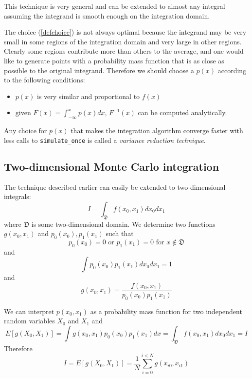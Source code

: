 \documentclass[justified,sixbynine]{tufte-book}
\def\ft{\small\tt}
\theoremstyle{plain}%
\theoremstyle{definition}
\theoremstyle{remark}
\begin{document}
\begin{fullwidth}
This technique is very general and can be extended to almost any integral
assuming the integrand is smooth enough on the integration domain.

The choice (\ref{defchoice}) is not always optimal because the integrand may
be very small in some regions of the integration domain and very large in
other regions. Clearly some regions contribute more than others to the
average, and one would like to generate points with a probability mass
function that is as close as possible to the original integrand. Therefore
we should choose a $p(x)$ according to the following conditions:

\begin{itemize}
\item  $p(x)$ is very similar and proportional to $f(x)$

\item  given $F(x)=\int_{-\infty }^xp(x)dx$, $F^{-1}(x)$ can be computed
analytically.
\end{itemize}

Any choice for $p(x)$ that makes the integration algorithm converge faster with less calls to {\ft simulate\_once} is called a {\it variance reduction technique}.

\goodbreak\subsection{Two-dimensional Monte Carlo integration}

The technique described earlier can easily be extended to two-dimensional integrals:
\begin{equation}
I=\int_{{\mathfrak D}}f(x_0,x_1)dx_0dx_1
\end{equation}
where ${\mathfrak D}$ is some two-dimensional domain. We determine two functions
$g(x_0,x_1)$ and $p_0(x_0),p_1(x_1)$ such that
\begin{equation}
p_0(x_0)=0\text{ or }p_1(x_1)=0\text{ for }x\notin {\mathfrak D}
\end{equation}
and
\begin{equation}
\int p_0(x_0)p_1(x_1)dx_0dx_1=1
\end{equation}
and
\begin{equation}
g(x_0,x_1)=\frac{f(x_0,x_1)}{p_0(x_0)p_1(x_1)}
\end{equation}

We can interpret $p(x_0,x_1)$ as a probability mass function for two
independent random variables $X_0$ and $X_1$ and
\begin{equation}
E[g(X_0,X_1)]=\int g(x_0,x_1)p_0(x_0)p_1(x_1)dx=\int_{{\mathfrak D}%
}f(x_0,x_1)dx_0dx_1=I
\end{equation}
Therefore
\begin{equation}
I = E[g(X_0,X_1)] = \frac 1N\sum_{i=0}^{i<N}g(x_{i0},x_{i1})
\end{equation}


\end{fullwidth}
\end{document}
